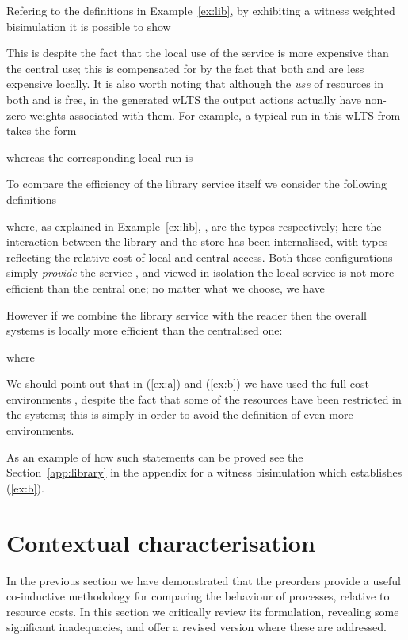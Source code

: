 \documentclass{LMCS}
\newcommand{\EndDefBox}{\null\hfill}
\newcommand{\boxHere}{\global\let\EndProof\empty\EndDefBox}
\begin{document}
\begin{exa}\label{ex:libagain}
  Refering to the definitions in Example~\ref{ex:lib}, by exhibiting a witness weighted bisimulation it is
possible to show

This is despite the fact that the local use of the service  is
more expensive than the central use; this is compensated for by the
fact that both  and  are less expensive locally. It
is also worth noting that although the \emph{use} of resources in both
 and  is free, in the generated
wLTS the output actions actually have non-zero weights associated with
them. For example, a typical run in this wLTS from  takes the form

whereas the corresponding local run is 





To compare the efficiency of the library service itself we consider the following definitions

where, as explained in Example~\ref{ex:lib}, 
, are the types  respectively; here the interaction
between the library and the store has been internalised, with  types  reflecting the relative cost of
local and central access.  Both these configurations simply \emph{provide} the service 
, and viewed in isolation the local service is not more efficient than the central one; no matter what
 we choose, we have 

However if we combine the library service with the reader then the overall systems is locally more efficient
than the centralised one:

where

We should point out that in (\ref{ex:a}) and (\ref{ex:b}) we have used the full cost environments
, despite the fact that some of the resources have been restricted in
the systems; this is simply in order to avoid the definition of even more environments. 

As an example of how such statements can be proved see the Section~\ref{app:library} in the appendix for a witness bisimulation which
establishes (\ref{ex:b}).  
\boxHere
\end{exa}




\section{Contextual characterisation}\label{sec:cxt}

In the previous section we have demonstrated that the preorders
 provide a useful co-inductive methodology for comparing the
behaviour of processes, relative to resource costs.  In this section
we critically review its formulation, revealing some significant
inadequacies, and offer a revised version where these are addressed.
\end{document}
